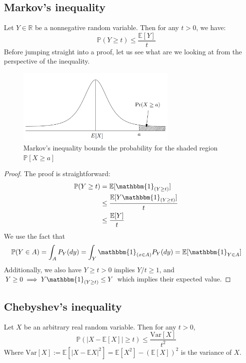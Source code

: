 \subsection{Markov's inequality}
Let $Y\in \mathbb{R}$ be a nonnegative random variable. Then for any $t> 0$, we have: 
\begin{equation}
    \mathbb{P}(Y\geq t) \leq \frac{\mathbb{E}[Y]}{t}
\end{equation}
Before jumping straight into a proof, let us see what are we looking at from the perspective of the inequality.
\begin{figure}[h!]
    \centering
    \includegraphics[width=0.7\textwidth]{img/markovbound.png}
    \caption{Markov's inequality bounds the probability for the shaded region $\mathbb{P}[X\geq a]$}
\end{figure}
\begin{proof}
    The proof is straightforward: \begin{equation}
        \begin{split}
            \mathbb{P}(Y\geq t) & = \mathbb{E}[\mathbbm{1}_{(Y\geq t)}]\\
            & \leq \frac{\mathbb{E}[Y\mathbbm{1}_{(Y\geq t)}]}{t}\\
            & \leq \frac{\mathbb{E}[Y]}{t}
        \end{split}
    \end{equation}
    We use the fact that\begin{equation}
        \mathbb{P}(Y\in A) = \int_{A} P_{Y} (dy) = \int_{Y} \mathbbm{1}_{(x\in A)} P_{Y}(dy) = \mathbb{E}[\mathbbm{1}_{Y\in A}]
    \end{equation}
    Additionally, we also have $Y\geq t > 0$ implies $Y/t \geq 1$, and $Y\geq 0\implies Y \mathbbm{1}_{(Y\geq t)}\leq Y$ which implies their expected value.
\end{proof}
\subsection{Chebyshev's inequality}
Let $X$ be an arbitrary real random variable. Then for any $t> 0$, 
\begin{equation}
    \mathbb{P}(|X-\mathbb{E}[X]| \geq t) \leq \frac{\mathrm{Var}[X]}{t^{2}} 
\end{equation}
Where $\mathrm{Var}[X]:= \mathbb{E}[|X-\mathbb{E}X|^{2}]=\mathbb{E}[X^{2}]- (\mathbb{E}[X])^{2}$ is the variance of $X$. 
